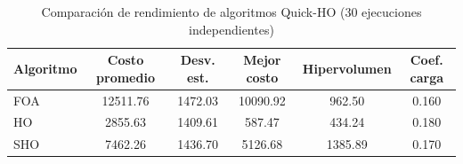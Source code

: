 \begin{table}[htbp]
\centering
\caption{Comparación de rendimiento de algoritmos Quick-HO (30 ejecuciones independientes)}
\label{tab:algorithm_performance}
\begin{tabular}{lSSSSS}
\toprule
Algoritmo & {Costo promedio} & {Desv. est.} & {Mejor costo} & {Hipervolumen} & {Coef. carga} \\
\midrule
FOA & 12511.76 & 1472.03 & 10090.92 & 962.50 & 0.160 \\
HO & 2855.63 & 1409.61 & 587.47 & 434.24 & 0.180 \\
SHO & 7462.26 & 1436.70 & 5126.68 & 1385.89 & 0.170 \\
\bottomrule
\end{tabular}
\end{table}
